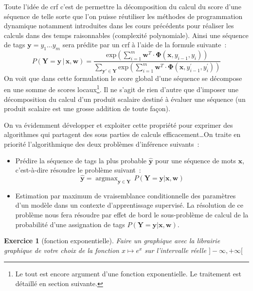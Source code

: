 \documentclass[11pt,openany]{book}
\newtheorem{exo}{Exercice}[chapter]
\newcommand{\ac}[1]{{\sc #1}} %
\begin{document}
Toute l'idée de \ac{crf} c'est de permettre la décomposition du calcul du score d'une séquence de telle sorte que l'on puisse réutiliser les méthodes de programmation dynamique notamment introduites dans les cours précédents pour réaliser les calculs dans des temps raisonnables (complexité polynomiale).  Ainsi une séquence de tags $\mathbf{y} = y_1 \ldots y_m$ sera prédite par un \ac{crf} à l'aide de la formule suivante~:
\begin{equation}
\label{eq-crf-predict}
P(\mathbf{Y} = \mathbf{y} \,|\, \mathbf{x},\mathbf{w}) = \frac{\text{exp}\left(\sum_{i=1}^m \mathbf{w}^T \cdot \boldsymbol\Phi(\mathbf{x},y_{i-1},y_i)\right)}
{\sum_{\mathbf{y}'\in \mathbf{Y}}
\text{exp}\left(\sum_{i=1}^m \mathbf{w}^T \cdot \boldsymbol\Phi(\mathbf{x},y^{'}_{i-1},y^{'}_i)\right)}
\end{equation}
On voit que dans cette formulation le score global d'une séquence se
décompose en une somme de scores locaux\footnote{Le tout est encore
  argument d'une fonction exponentielle. Le traitement est détaillé en
section suivante.}.  Il ne s'agit de rien d'autre que d'imposer une décomposition du calcul d'un produit scalaire destiné à évaluer une séquence (un produit scalaire est une grosse addition de toute façon).

On va évidemment développer et exploiter  cette propriété pour exprimer des algorithmes qui partagent des sous parties de calculs efficacement\ldots  On traite en priorité l'algorithmique des deux problèmes d'inférence suivants~:
\begin{itemize}
\item Prédire la séquence de tags la plus probable $\hat{\mathbf{y}}$ pour une séquence de mots $\mathbf{x}$, c'est-à-dire résoudre le problème suivant~:
\begin{equation}
\label{eq-crf-argmax}
\hat{\mathbf{y}} =  \mathop{\text{argmax}}_{\mathbf{y}\in \mathbf{Y}}
\, P(\mathbf{Y}=\mathbf{y} | \mathbf{x},\mathbf{w})
\end{equation}
\item Estimation par maximum de vraisemblance conditionnelle des paramètres d'un modèle dans un contexte d'apprentissage supervisé.
La résolution de ce problème nous fera résoudre par effet de bord le sous-problème de calcul de la probabilité d'une assignation de tags $P(\mathbf{Y}=\mathbf{y} | \mathbf{x},\mathbf{w})$.
\end{itemize}

\begin{exo}[fonction exponentielle]
Faire un graphique avec la librairie graphique de votre choix de la fonction $x\mapsto e^x $ sur l'intervalle réelle $]-\infty,+\infty[$
\end{exo}
\end{document}
